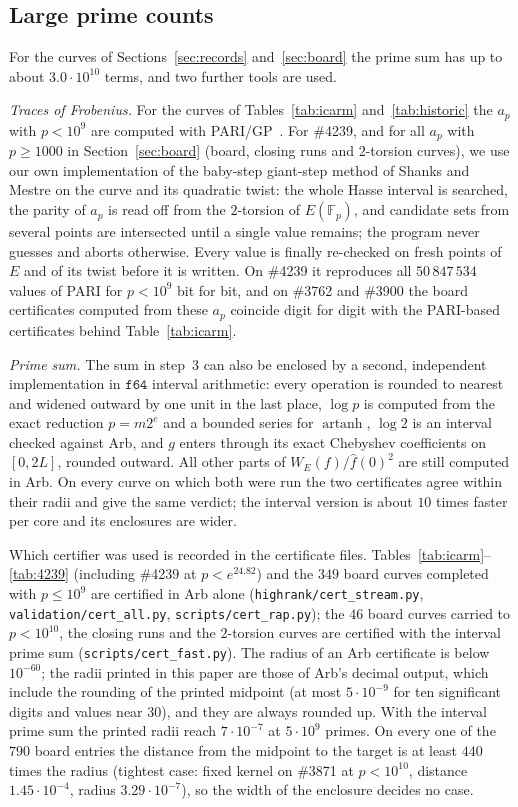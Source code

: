 \documentclass[11pt]{amsart}
\theoremstyle{remark}
\theoremstyle{definition}
\begin{document}
\subsection*{Large prime counts}
For the curves of Sections~\ref{sec:records} and~\ref{sec:board} the prime sum has up to about $3.0\cdot10^{10}$ terms, and two further tools are used.

\emph{Traces of Frobenius.} For the curves of Tables~\ref{tab:icarm} and~\ref{tab:historic} the $a_p$ with $p<10^9$ are computed with PARI/GP~\cite{PARI}. For \#4239, and for all $a_p$ with $p\ge1000$ in Section~\ref{sec:board} (board, closing runs and $2$-torsion curves), we use our own implementation of the baby-step giant-step method of Shanks and Mestre on the curve and its quadratic twist: the whole Hasse interval is searched, the parity of $a_p$ is read off from the $2$-torsion of $E(\mathbb F_p)$, and candidate sets from several points are intersected until a single value remains; the program never guesses and aborts otherwise. Every value is finally re-checked on fresh points of $E$ and of its twist before it is written. On \#4239 it reproduces all $50\,847\,534$ values of PARI for $p<10^9$ bit for bit, and on \#3762 and \#3900 the board certificates computed from these $a_p$ coincide digit for digit with the PARI-based certificates behind Table~\ref{tab:icarm}.

\emph{Prime sum.} The sum in step~3 can also be enclosed by a second, independent implementation in $\mathtt{f64}$ interval arithmetic: every operation is rounded to nearest and widened outward by one unit in the last place, $\log p$ is computed from the exact reduction $p=m2^e$ and a bounded series for $\operatorname{artanh}$, $\log 2$ is an interval checked against Arb, and $g$ enters through its exact Chebyshev coefficients on $[0,2L]$, rounded outward. All other parts of $W_E(f)/\hat f(0)^2$ are still computed in Arb. On every curve on which both were run the two certificates agree within their radii and give the same verdict; the interval version is about $10$ times faster per core and its enclosures are wider.

Which certifier was used is recorded in the certificate files. Tables~\ref{tab:icarm}--\ref{tab:4239} (including \#4239 at $p<e^{24.82}$) and the $349$ board curves completed with $p\le10^9$ are certified in Arb alone (\texttt{highrank/cert\_stream.py}, \texttt{validation/cert\_all.py}, \texttt{scripts/cert\_rap.py}); the $46$ board curves carried to $p<10^{10}$, the closing runs and the $2$-torsion curves are certified with the interval prime sum (\texttt{scripts/cert\_fast.py}). The radius of an Arb certificate is below $10^{-60}$; the radii printed in this paper are those of Arb's decimal output, which include the rounding of the printed midpoint (at most $5\cdot10^{-9}$ for ten significant digits and values near $30$), and they are always rounded up. With the interval prime sum the printed radii reach $7\cdot10^{-7}$ at $5\cdot10^9$ primes. On every one of the $790$ board entries the distance from the midpoint to the target is at least $440$ times the radius (tightest case: fixed kernel on \#3871 at $p<10^{10}$, distance $1.45\cdot10^{-4}$, radius $3.29\cdot10^{-7}$), so the width of the enclosure decides no case.
\end{document}
